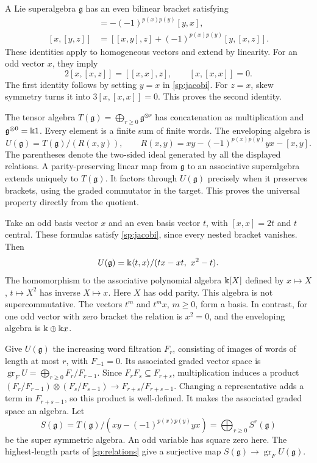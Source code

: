 A Lie superalgebra $\mathfrak g$ has an even bilinear bracket satisfying
\begin{align}
 [x,y]&=-(-1)^{p(x)p(y)}[y,x],\\
 [x,[y,z]]&=[[x,y],z]+(-1)^{p(x)p(y)}[y,[x,z]].
 \label{sp:jacobi}
\end{align}
These identities apply to homogeneous vectors and extend by linearity.
For an odd vector $x$, they imply
\begin{equation}
 2[x,[x,z]]=[[x,x],z],\qquad [x,[x,x]]=0.
 \label{sp:odd-jacobi}
\end{equation}
The first identity follows by setting $y=x$ in \eqref{sp:jacobi}.
For $z=x$, skew symmetry turns it into $3[x,[x,x]]=0$.
This proves the second identity.

The tensor algebra
$T(\mathfrak g)=\bigoplus_{r\geq0}\mathfrak g^{\otimes r}$
has concatenation as multiplication and $\mathfrak g^{\otimes0}=\Bbbk1$.
Every element is a finite sum of finite words.  The enveloping algebra is
\begin{equation}
 U(\mathfrak g)=T(\mathfrak g)/(R(x,y)),\qquad
 R(x,y)=xy-(-1)^{p(x)p(y)}yx-[x,y].
 \label{sp:relations}
\end{equation}
The parentheses denote the two-sided ideal generated by all the
displayed relations.  A parity-preserving linear map from $\mathfrak g$
to an associative superalgebra extends uniquely to $T(\mathfrak g)$.
It factors through $U(\mathfrak g)$ precisely when it preserves brackets,
using the graded commutator in the target.  This proves the universal
property directly from the quotient.

\begin{example}\label{sp:odd-square}
Take an odd basis vector $x$ and an even basis vector $t$, with
$[x,x]=2t$ and $t$ central.  These formulas satisfy
\eqref{sp:jacobi}, since every nested bracket vanishes.
Then
\[
 U(\mathfrak g)=\kk\langle t,x\rangle/(tx-xt,\ x^2-t).
\]
The homomorphism to the associative polynomial algebra $\Bbbk[X]$ defined
by $x\mapsto X$, $t\mapsto X^2$ has inverse $X\mapsto x$.
Here $X$ has odd parity.  This algebra is not supercommutative.
The vectors $t^m$ and $t^mx$, $m\geq0$, form a basis.
In contrast, for one odd vector with zero bracket the relation is
$x^2=0$, and the enveloping algebra is $\Bbbk\oplus \Bbbk x$.
\end{example}

Give $U(\mathfrak g)$ the increasing word filtration $F_r$, consisting
of images of words of length at most $r$, with $F_{-1}=0$.
Its associated graded vector space is
$\operatorname{gr}_F U=\bigoplus_{r\geq0}F_r/F_{r-1}$.
Since $F_rF_s\subseteq F_{r+s}$, multiplication induces a product
$(F_r/F_{r-1})\otimes(F_s/F_{s-1})\to F_{r+s}/F_{r+s-1}$.
Changing a representative adds a term in $F_{r+s-1}$, so this product
is well-defined. It makes the associated graded space an algebra.
Let
\[
 S(\mathfrak g)=T(\mathfrak g)/(xy-(-1)^{p(x)p(y)}yx)
             =\bigoplus_{r\geq0}S^r(\mathfrak g)
\]
be the super symmetric algebra.  An odd variable has square zero here.
The highest-length parts of \eqref{sp:relations} give a surjective map
$S(\mathfrak g)\to\operatorname{gr}_F U(\mathfrak g)$.

